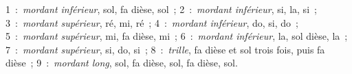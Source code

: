 1~:~\emph{mordant inférieur}, sol, fa dièse, sol~; 2~:~\emph{mordant inférieur}, si, la, si~; 3~:~\emph{mordant supérieur}, ré, mi, ré~; 4~:~\emph{mordant inférieur}, do, si, do~; 5~:~\emph{mordant supérieur}, mi, fa dièse, mi~; 6~:~\emph{mordant inférieur}, la, sol dièse, la~; 7~:~\emph{mordant supérieur}, si, do, si~; 8~:~\emph{trille}, fa dièse et sol trois fois, puis fa dièse~; 9~:~\emph{mordant long}, sol, fa dièse, sol, fa dièse, sol.
